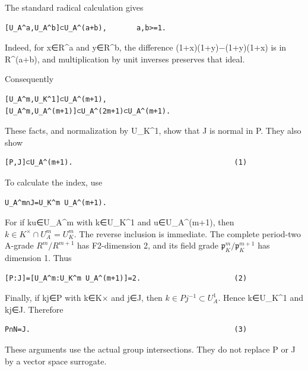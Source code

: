 The standard radical calculation gives

\begin{Verbatim}[fontsize=\small,breaklines=true,breakanywhere=true]
[U_A^a,U_A^b]⊂U_A^(a+b),       a,b>=1.
\end{Verbatim}

Indeed, for x∈R\^{}a and y∈R\^{}b, the difference (1+x)(1+y)−(1+y)(1+x)
is in R\^{}(a+b), and multiplication by unit inverses preserves that
ideal.

Consequently

\begin{Verbatim}[fontsize=\small,breaklines=true,breakanywhere=true]
[U_A^m,U_K^1]⊂U_A^(m+1),
[U_A^m,U_A^(m+1)]⊂U_A^(2m+1)⊂U_A^(m+1).
\end{Verbatim}

These facts, and normalization by U\_K\^{}1, show that J is normal in P.
They also show

\begin{Verbatim}[fontsize=\small,breaklines=true,breakanywhere=true]
[P,J]⊂U_A^(m+1).                                      (1)
\end{Verbatim}

To calculate the index, use

\begin{Verbatim}[fontsize=\small,breaklines=true,breakanywhere=true]
U_A^m∩J=U_K^m U_A^(m+1).
\end{Verbatim}

For if ku∈U\_A\^{}m with k∈U\_K\^{}1 and u∈U\_A\^{}(m+1), then
\(k\in K^\times\cap U_A^m=U_K^m\). The reverse inclusion is immediate.
The complete period-two A-grade \(R^m/R^{m+1}\) has
F2-dimension 2, and its field grade \(\mathfrak p_K^m/\mathfrak p_K^{m+1}\) has
dimension 1. Thus

\begin{Verbatim}[fontsize=\small,breaklines=true,breakanywhere=true]
[P:J]=[U_A^m:U_K^m U_A^(m+1)]=2.                      (2)
\end{Verbatim}

Finally, if kj∈P with k∈K× and j∈J, then \(k\in Pj^{-1}\subset U_A^1\).
Hence k∈U\_K\^{}1 and kj∈J. Therefore

\begin{Verbatim}[fontsize=\small,breaklines=true,breakanywhere=true]
P∩N=J.                                                (3)
\end{Verbatim}

These arguments use the actual group intersections. They do not replace
P or J by a vector space surrogate.

